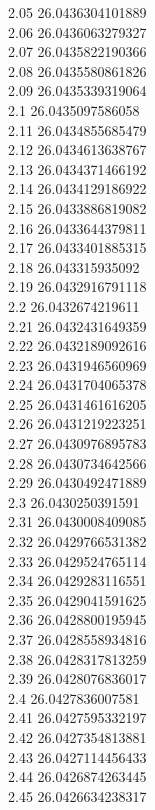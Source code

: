 {2.05	26.0436304101889\\
2.06	26.0436063279327\\
2.07	26.0435822190366\\
2.08	26.0435580861826\\
2.09	26.0435339319064\\
2.1	26.0435097586058\\
2.11	26.0434855685479\\
2.12	26.0434613638767\\
2.13	26.0434371466192\\
2.14	26.0434129186922\\
2.15	26.0433886819082\\
2.16	26.0433644379811\\
2.17	26.0433401885315\\
2.18	26.043315935092\\
2.19	26.0432916791118\\
2.2	26.0432674219611\\
2.21	26.0432431649359\\
2.22	26.0432189092616\\
2.23	26.0431946560969\\
2.24	26.0431704065378\\
2.25	26.0431461616205\\
2.26	26.0431219223251\\
2.27	26.0430976895783\\
2.28	26.0430734642566\\
2.29	26.0430492471889\\
2.3	26.0430250391591\\
2.31	26.0430008409085\\
2.32	26.0429766531382\\
2.33	26.0429524765114\\
2.34	26.0429283116551\\
2.35	26.0429041591625\\
2.36	26.0428800195945\\
2.37	26.0428558934816\\
2.38	26.0428317813259\\
2.39	26.0428076836017\\
2.4	26.0427836007581\\
2.41	26.0427595332197\\
2.42	26.0427354813881\\
2.43	26.0427114456433\\
2.44	26.0426874263445\\
2.45	26.0426634238317\\
}
